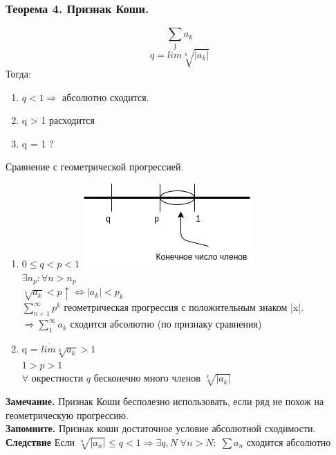\documentclass[12pt, paper]{article}
\begin{document}
\subsubsection{Теорема 4. Признак Коши.}
\[ \sum_1  a_k\]
\[q = \overline{lim} \sqrt[k]{|a_k|} \]
Тогда:
\begin{enumerate}
    \item $q < 1 \Rightarrow$ абсолютно сходится.
    \item q > 1 расходится
    \item q = 1 ?
\end{enumerate}
\begin{tcolorbox}[title=Доказательство]
    Сравнение с геометрической прогрессией.\\
    \begin{enumerate}
        \item $ 0 \leq q < p < 1 $
        \includegraphics[width=0.5\linewidth]{images/Ряды/Признак Коши Док-во.png}\\
        $\exists n_p: \forall n>n_p$\\
        $\sqrt[k]{a_k} < p \uparrow \Leftrightarrow |a_k| < p_k$\\
        $\sum^{\infty}_{n+1} p^k$ геометрическая прогрессия с положительным знаком |x|.\\
        $\Rightarrow \sum^{\infty}_{1} a_k$ сходится абсолютно (по признаку сравнения)
        \item q = $\overline{lim} \sqrt[k]{a_k} > 1$\\
        $1 > p > 1$\\
        $\forall$ окрестности $q$ бесконечно много членов $\sqrt[k]{|a_k|} $
    \end{enumerate}
\end{tcolorbox}
\textbf{Замечание.} Признак Коши бесполезно использовать, если ряд не похож на геометрическую прогрессию.\\
\textbf{Запомните.} Признак коши достаточное условие абсолютной сходимости.\\
\textbf{Следствие} Если $ \sqrt[n]{|a_n|} \leq q < 1 \Rightarrow \exists q,N\; \forall n > N: \;  \sum a_n$ сходится абсолютно
\end{document}
